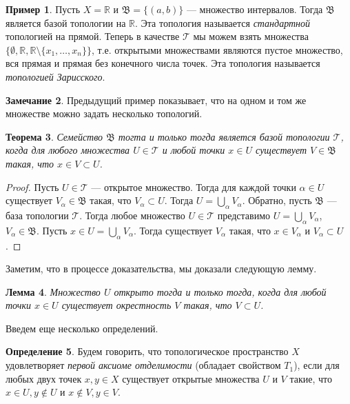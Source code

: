 \documentclass[12pt, titlepage, oneside]{amsbook}
\newcommand{\TTT}{{\mathcal T}}
\newcommand{\RR}{\mathbb{R}}
\newcommand{\BBB}{\mathfrak{B}}
\newtheorem{theorem}{Теорема}[chapter]
\newtheorem{lemma}[theorem]{Лемма}
\theoremstyle{definition}
\newtheorem{example}[theorem]{Пример}
\newtheorem{definition}[theorem]{Определение}
\newtheorem{remark}[theorem]{Замечание}
\theoremstyle{remark}
\begin{document}
\begin{example}
Пусть $X=\RR$ и $\BBB=\{(a,b)\}$ --- множество интервалов. Тогда $\BBB$ является базой топологии на $\RR$. Эта топология называется \emph{стандартной} топологией на прямой. Теперь в качестве $\TTT$ мы можем взять множества $\{\emptyset,\RR,\RR\setminus\{x_1,\ldots,x_n\}\}$, т.е. открытыми множествами являются пустое множество, вся прямая и прямая без конечного числа точек. Эта топология называется \emph{топологией Зарисского}.
\end{example}

\begin{remark}
Предыдущий пример показывает, что на одном и том же множестве можно задать несколько топологий.
\end{remark}

\begin{theorem}
\label{Top1}
Семейство $\BBB$ тогта и только тогда является базой топологии $\TTT$, когда для любого множества $U\in\TTT$ и любой точки $x\in U$ существует $V\in\BBB$ такая, что $x\in V\subset U$.
\end{theorem}

\begin{proof}
Пусть $U\in\TTT$ --- открытое множество. Тогда для каждой точки $\alpha\in U$ существует $V_\alpha\in\BBB$ такая, что $V_\alpha\subset U$. Тогда $U=\bigcup\limits_{\alpha} V_\alpha$. Обратно, пусть $\BBB$ --- база топологии $\TTT$. Тогда любое множество $U\in\TTT$ представимо $U=\bigcup\limits_{\alpha} V_\alpha$, $V_\alpha\in\BBB$. Пусть $x\in U=\bigcup\limits_{\alpha} V_\alpha$. Тогда существует $V_\alpha$ такая, что $x\in V_\alpha$ и $V_\alpha\subset U$.
\end{proof}

Заметим, что в процессе доказательства, мы доказали следующую лемму.
\begin{lemma}
\label{Top2}
Множество $U$ открыто тогда и только тогда, когда для любой точки $x\in U$ существует окрестность $V$ такая, что $V\subset U$.
\end{lemma}

Введем еще несколько определений.

\begin{definition}
Будем говорить, что топологическое пространство $X$ удовлетворяет \emph{первой аксиоме отделимости} (обладает свойством $T_1$), если для любых двух точек $x,y\in X$ существует открытые множества $U$ и $V$ такие, что $x\in U, y\not\in U$ и $x\not\in V, y\in V$.
\end{definition}
\end{document}
